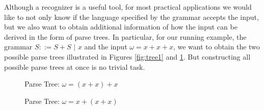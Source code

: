 %
\begin{isabellebody}%
%
%
\isadelimtheory
%
\endisadelimtheory
%
\isatagtheory
%
\endisatagtheory
{\isafoldtheory}%
%
\isadelimtheory
%
\endisadelimtheory
%
\isadelimdocument
%
\endisadelimdocument
%
\isatagdocument
%
\isamarkuptrue%
%
\endisatagdocument
{\isafolddocument}%
%
\isadelimdocument
%
\endisadelimdocument
%
\begin{isamarkuptext}%
Although a recognizer is a useful tool, for most practical applications we would like to not only
know if the language specified by the grammar accepts the input, but we also want to obtain additional information
of how the input can be derived in the form of parse trees. In particular, for our running example, the
grammar $S ::= S + S \,\, | \,\, x$ and the input $\omega = x + x + x$, we want to obtain the two possible parse
trees illustrated in Figures \ref{fig:tree1} and \ref{fig:tree2}. But constructing all possible parse trees at once is no
trivial task.

\begin{figure}[htpb]
    \centering
    \begin{minipage}{0.45\textwidth}
        \centering
        \caption{Parse Tree: $\omega = (x + x) + x$} \label{fig:tree1}
    \end{minipage}\hfill
    \begin{minipage}{0.45\textwidth}
        \centering
        \caption{Parse Tree: $\omega = x + (x + x)$} \label{fig:tree2}
    \end{minipage}
\end{figure}


\end{isamarkuptext}
\end{isabellebody}
